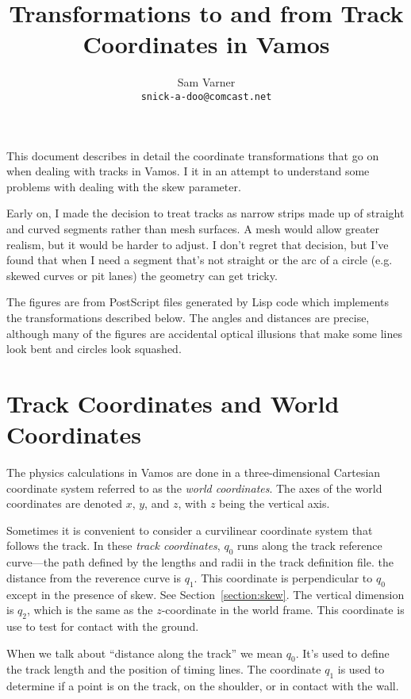 \documentclass{article}
\begin{document}
\title{Transformations to and from Track Coordinates in Vamos}
\author{Sam Varner\\ \texttt{snick-a-doo@comcast.net}}
\maketitle

This document describes in detail the coordinate transformations that
go on when dealing with tracks in Vamos.  I it in an attempt to
understand some problems with dealing with the skew parameter.

Early on, I made the decision to treat tracks as narrow strips made up
of straight and curved segments rather than mesh surfaces.  A mesh
would allow greater realism, but it would be harder to adjust.  I
don't regret that decision, but I've found that when I need a segment
that's not straight or the arc of a circle (e.g. skewed curves or pit
lanes) the geometry can get tricky.

The figures are from PostScript files generated by Lisp code which
implements the transformations described below.  The angles and
distances are precise, although many of the figures are accidental
optical illusions that make some lines look bent and circles look
squashed. 

\section{Track Coordinates and World Coordinates}

The physics calculations in Vamos are done in a three-dimensional
Cartesian coordinate system referred to as the {\em world
  coordinates}.  The axes of the world coordinates are denoted $x$,
$y$, and $z$, with $z$ being the vertical axis.

Sometimes it is convenient to consider a curvilinear coordinate system
that follows the track.  In these {\em track coordinates}, $q_0$ runs
along the track reference curve---the path defined by the lengths and
radii in the track definition file.  the distance from the reverence
curve is $q_1$.  This coordinate is perpendicular to $q_0$ except in
the presence of skew.  See Section~\ref{section:skew}.  The vertical
dimension is $q_2$, which is the same as the $z$-coordinate in the
world frame.  This coordinate is use to test for contact with the
ground.

When we talk about ``distance along the track'' we mean $q_0$.  It's
used to define the track length and the position of timing lines.  The
coordinate $q_1$ is used to determine if a point is on the track, on
the shoulder, or in contact with the wall.
\end{document}
